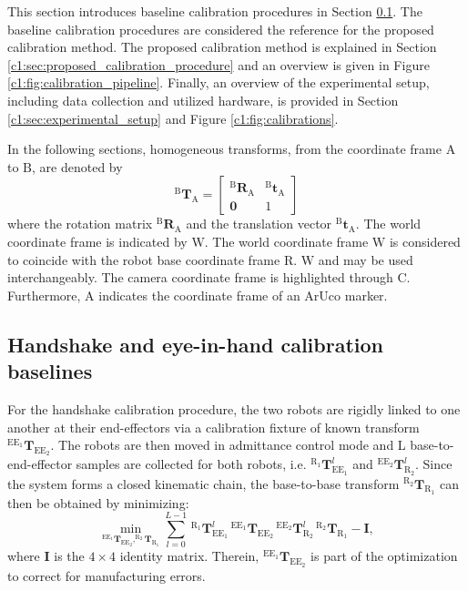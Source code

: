 This section introduces baseline calibration procedures in Section \ref{c1:sec:handshake_and_eye_in_hand_calibration}. The baseline calibration procedures are considered the reference for the proposed calibration method. The proposed calibration method is explained in Section \ref{c1:sec:proposed_calibration_procedure} and an overview is given in Figure \ref{c1:fig:calibration_pipeline}. Finally, an overview of the experimental setup, including data collection and utilized hardware, is provided in Section \ref{c1:sec:experimental_setup} and Figure \ref{c1:fig:calibrations}.

In the following sections, homogeneous transforms, from the coordinate frame $\text{A}$ to $\text{B}$, are denoted by $$^\text{B}\mathbf{T}_\text{A}=\begin{bmatrix} ^\text{B}\mathbf{R}_\text{A} & ^\text{B}\textbf{t}_\text{A} \\ \mathbf{0} & 1 \end{bmatrix}$$ where the rotation matrix $^\text{B}\mathbf{R}_\text{A}$ and the translation vector $^\text{B}\textbf{t}_\text{A}$. The world coordinate frame is indicated by $\text{W}$. The world coordinate frame $\text{W}$ is considered to coincide with the robot base coordinate frame $\text{R}$. $\text{W}$ and  may be used interchangeably. The camera coordinate frame is highlighted through $\text{C}$. Furthermore, $\text{A}$ indicates the coordinate frame of an ArUco marker.

\subsection{Handshake and eye-in-hand calibration baselines}
\label{c1:sec:handshake_and_eye_in_hand_calibration}
For the handshake calibration procedure, the two robots are rigidly linked to one another at their end-effectors via a calibration fixture of known transform $^{\text{EE}_1}\mathbf{T}_{\text{EE}_2}$. The robots are then moved in admittance control mode and L base-to-end-effector samples are collected for both robots, i.e. $^{\text{R}_1}\mathbf{T}^l_{\text{EE}_1}$ and $^{\text{EE}_2}\mathbf{T}^l_{\text{R}_2}$. Since the system forms a closed kinematic chain, the base-to-base transform $^{\text{R}_2}\mathbf{T}_{\text{R}_1}$ can then be obtained by minimizing:
%
\begin{equation}
    \label{c1:eq:handsake}
    \min_{^{\text{EE}_1}\mathbf{T}_{\text{EE}_2}, ^{\text{R}_2}\mathbf{T}_{\text{R}_1}} \sum_{l=0}^{L-1}\,^{\text{R}_1}\mathbf{T}^l_{\text{EE}_1}\,^{\text{EE}_1}\mathbf{T}_{\text{EE}_2}\,^{\text{EE}_2}\mathbf{T}^l_{\text{R}_2}\,^{\text{R}_2}\mathbf{T}_{\text{R}_1} - \mathbf{I},
\end{equation}
%
where $\mathbf{I}$ is the $4\times4$ identity matrix. Therein, $^{\text{EE}_1}\mathbf{T}_{\text{EE}_2}$ is part of the optimization to correct for manufacturing errors.

